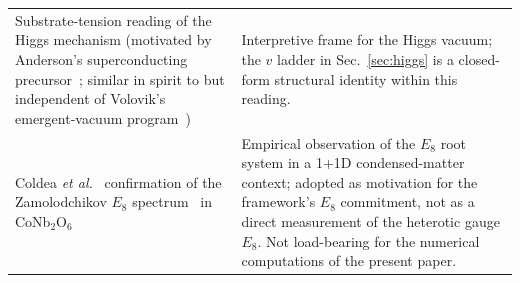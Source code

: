 ﻿\documentclass[reprint,amsmath,amssymb,aps,prd,longbibliography,floatfix]{revtex4-2}
\begin{document}
\begin{table}[t]
\begin{tabular}{ll}
\parbox[t]{0.32\textwidth}{Substrate-tension reading of the Higgs mechanism (motivated by Anderson's superconducting precursor~\cite{Anderson1962}; similar in spirit to but independent of Volovik's emergent-vacuum program~\cite{Volovik2003})} & \parbox[t]{0.62\textwidth}{Interpretive frame for the Higgs vacuum; the $v$ ladder in Sec.~\ref{sec:higgs} is a closed-form structural identity within this reading.} \\[0.5ex]
\parbox[t]{0.32\textwidth}{Coldea \textit{et al.}~\cite{Coldea2010} confirmation of the Zamolodchikov $E_8$ spectrum~\cite{Zamolodchikov1989} in CoNb$_2$O$_6$} & \parbox[t]{0.62\textwidth}{Empirical observation of the $E_8$ root system in a 1+1D condensed-matter context; adopted as motivation for the framework's $E_8$ commitment, not as a direct measurement of the heterotic gauge $E_8$. Not load-bearing for the numerical computations of the present paper.} \\
\bottomrule
\end{tabular}
\end{table}
\end{document}
